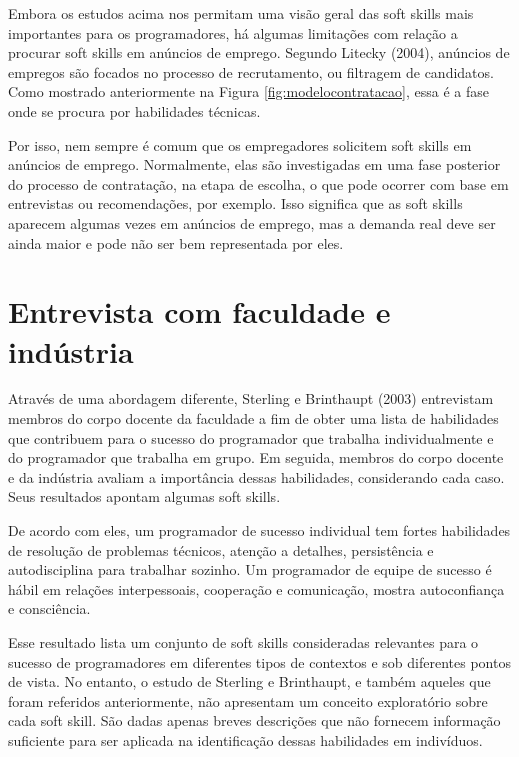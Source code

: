 Embora os estudos acima nos permitam uma visão geral das soft skills mais importantes para os programadores, há algumas limitações com relação a procurar soft skills em anúncios de emprego. Segundo Litecky (2004)\nocite{litecky:04}, anúncios de empregos são focados no processo de recrutamento, ou filtragem de candidatos. Como mostrado anteriormente na Figura \ref{fig:modelocontratacao}, essa é a fase onde se procura por habilidades técnicas.

Por isso, nem sempre é comum que os empregadores solicitem soft skills em anúncios de emprego.
Normalmente, elas são investigadas em uma fase posterior do processo de contratação, na etapa de escolha, o que pode ocorrer com base em entrevistas ou recomendações, por exemplo. Isso significa que as soft skills aparecem algumas vezes em anúncios de emprego, mas a demanda real deve ser ainda maior e pode não ser bem representada por eles.

\section{Entrevista com faculdade e indústria}
\label{sec:entrevista}

Através de uma abordagem diferente, Sterling e Brinthaupt (2003)\nocite{sterling:03} entrevistam membros do corpo docente da faculdade a fim de obter uma lista de habilidades que contribuem para o sucesso do programador que trabalha individualmente e do programador que trabalha em grupo. Em seguida, membros do corpo docente e da indústria avaliam a importância dessas habilidades, considerando cada caso. Seus resultados apontam algumas soft skills.

De acordo com eles, um programador de sucesso individual tem fortes habilidades de resolução de problemas técnicos, atenção a detalhes, persistência e autodisciplina para trabalhar sozinho. Um programador de equipe de sucesso é hábil em relações interpessoais, cooperação e comunicação, mostra autoconfiança e consciência.

Esse resultado lista um conjunto de soft skills consideradas relevantes para o sucesso de programadores em diferentes tipos de contextos e sob diferentes pontos de vista. No entanto, o estudo de Sterling e Brinthaupt, e também aqueles que foram referidos anteriormente, não apresentam um conceito exploratório sobre cada soft skill. São dadas apenas breves descrições que não fornecem informação suficiente para ser aplicada na identificação dessas habilidades em indivíduos.

